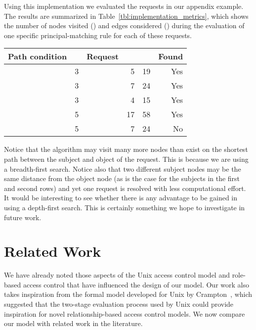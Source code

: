 \documentclass{article}
\begin{document}
Using this implementation we evaluated the requests in our appendix example.
The results are summarized in Table~\ref{tbl:implementation_metrics}, which shows the number of nodes visited () and edges considered () during the evaluation of one specific principal-matching rule for each of these requests.

\begin{table*}[!ht]\centering
  {\renewcommand{\arraystretch}{1.25}
  \begin{tabular}{|r|r|l|r|r|r|}
    \hline
        \bf Path condition  &  & \bf Request &  &  & \bf Found\\
    \hline
    \hline
         & 3 &  & 5 & 19 & Yes\\
         & 3 &  & 7 & 24 & Yes\\
          & 3 &  & 4 & 15 & Yes\\
         & 5 &  & 17 & 58 & Yes\\
         & 5 &  & 7 & 24 & No\\
    \hline
  \end{tabular}}
\caption{Running our implementation of \textsf{MatchPrincipal} using path conditions and requests from Tables~\ref{tbl:example_company_principal_matching_policy} and~\ref{tbl:example_company_requests}}\label{tbl:implementation_metrics}
\end{table*}

Notice that the algorithm may visit many more nodes than exist on the shortest path between the subject and object of the request.
This is because we are using a breadth-first search.
Notice also that two different subject nodes may be the same distance from the object node (as is the case for the subjects in the first and second rows) and yet one request is resolved with less computational effort.
It would be interesting to see whether there is any advantage to be gained in using a depth-first search.
This is certainly something we hope to investigate in future work.


\section{Related Work}\label{sec:RelatedWork}

We have already noted those aspects of the Unix access control model and role-based access control that have influenced the design of our model.
Our work also takes inspiration from the formal model developed for Unix by Crampton~\cite{Crampton_UnixAccessControl}, which suggested that the two-stage evaluation process used by Unix could provide inspiration for novel relationship-based access control models.
We now compare our model with related work in the literature.
\end{document}
